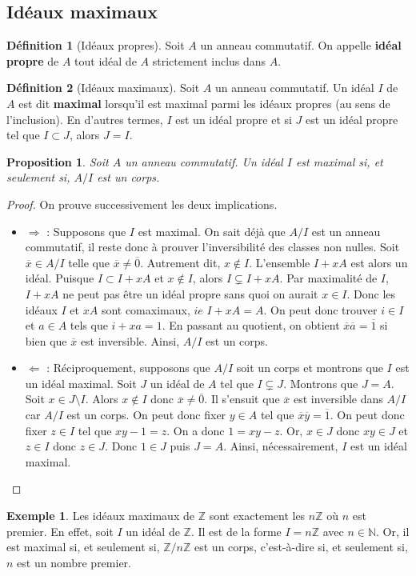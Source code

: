 \documentclass[french]{book}
\newcommand{\N}{\mathbb{N}}
\newcommand{\Z}{\mathbb{Z}}
\theoremstyle{plain}
\newtheorem{prop}{Proposition}[chapter]
\theoremstyle{definition}
\newtheorem{dfn}{Définition}[chapter]
\newtheorem{exa}{Exemple}[chapter]
\theoremstyle{remark}
\begin{document}
\subsection{Idéaux maximaux}
\begin{dfn}[Idéaux propres]
	Soit $A$ un anneau commutatif. On appelle \textbf{idéal propre} de $A$ tout idéal de $A$ strictement inclus dans $A$.
\end{dfn}
\begin{dfn}[Idéaux maximaux]
	Soit $A$ un anneau commutatif. Un idéal $I$ de $A$ est dit \textbf{maximal} lorsqu'il est maximal parmi les idéaux propres (au sens de l'inclusion). En d'autres termes, $I$ est un idéal propre et si $J$ est un idéal propre tel que $I\subset J$, alors $J=I$.
\end{dfn}
\begin{prop}
	Soit $A$ un anneau commutatif. Un idéal $I$ est maximal si, et seulement si, $A/I$ est un corps.
\end{prop}
\begin{proof}
	On prouve successivement les deux implications.
	\begin{itemize}
		\item $\Longrightarrow$ : Supposons que $I$ est maximal. On sait déjà que $A/I$ est un anneau commutatif, il reste donc à prouver l'inversibilité des classes non nulles. Soit $\overline{x}\in A/I$ telle que $\overline{x}\ne\overline{0}$. Autrement dit, $x\notin I$. L'ensemble $I+xA$ est alors un idéal. Puisque $I\subset I+xA$ et $x\notin I$, alors $I\subsetneq I+xA$. Par maximalité de $I$, $I+xA$ ne peut pas être un idéal propre sans quoi on aurait $x\in I$. Donc les idéaux $I$ et $xA$ sont comaximaux, $ie$ $I+xA=A$. On peut donc trouver $i\in I$ et $a\in A$ tels que $i+xa=1$. En passant au quotient, on obtient $\overline{x}\overline{a}=\overline{1}$ si bien que $\overline{x}$ est inversible. Ainsi, $A/I$ est un corps.
		\item $\Longleftarrow$ : Réciproquement, supposons que $A/I$ soit un corps et montrons que $I$ est un idéal maximal. Soit $J$ un idéal de $A$ tel que $I\subsetneq J$. Montrons que $J=A$. Soit $x\in J\setminus I$. Alors $x\notin I$ donc $\overline{x}\ne\overline{0}$. Il s'ensuit que $\overline{x}$ est inversible dans $A/I$ car $A/I$ est un corps. On peut donc fixer $y\in A$ tel que $\overline{x}\overline{y}=\overline{1}$. On peut donc fixer $z\in I$ tel que $xy-1=z$. On a donc $1=xy-z$. Or, $x\in J$ donc $xy\in J$ et $z\in I$ donc $z\in J$. Donc $1\in J$ puis $J=A$. Ainsi, nécessairement, $I$ est un idéal maximal.
	\end{itemize}
\end{proof}
\begin{exa}
	Les idéaux maximaux de $\Z$ sont exactement les $n\Z$ où $n$ est premier. En effet, soit $I$ un idéal de $\Z$. Il est de la forme $I=n\Z$ avec $n\in\N$. Or, il est maximal si, et seulement si, $\Z/n\Z$ est un corps, c'est-à-dire si, et seulement si, $n$ est un nombre premier.
\end{exa}
\end{document}
